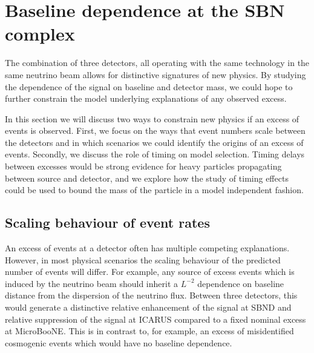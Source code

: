 \documentclass[11pt, a4paper]{article}
\def\muboone{MicroBooNE}
\begin{document}
\section{\label{sec:baselineinterplay}Baseline dependence at the SBN complex}
The combination of three detectors, all operating with the same technology in
the same neutrino beam allows for distinctive signatures of new physics. By
studying the dependence of the signal on baseline and detector mass, we could
hope to further constrain the model underlying explanations of any observed
excess.  

In this section we will discuss two ways to constrain new physics if an excess
of events is observed. First, we focus on the ways that event numbers scale
between the detectors and in which scenarios we could identify the origins of
an excess of events. Secondly, we discuss the role of timing on model selection.
Timing delays between excesses would be strong evidence for heavy particles 
propagating between source and detector, and we explore how the study of timing
effects could be used to bound the mass of the particle in a model independent 
fashion.

\subsection{Scaling behaviour of event rates}
%

An excess of events at a detector often has multiple competing explanations.
However, in most physical scenarios the scaling behaviour of the predicted
number of events will differ. For example, any source of excess events which is
induced by the neutrino beam should inherit a $L^{-2}$ dependence on baseline
distance from the dispersion of the neutrino flux. Between three detectors,
this would generate a distinctive relative enhancement of the signal at SBND
and relative suppression of the signal at ICARUS compared to a fixed nominal
excess at \muboone. This is in contrast to, for example, an excess of
misidentified cosmogenic events which would have no baseline dependence.
\end{document}
